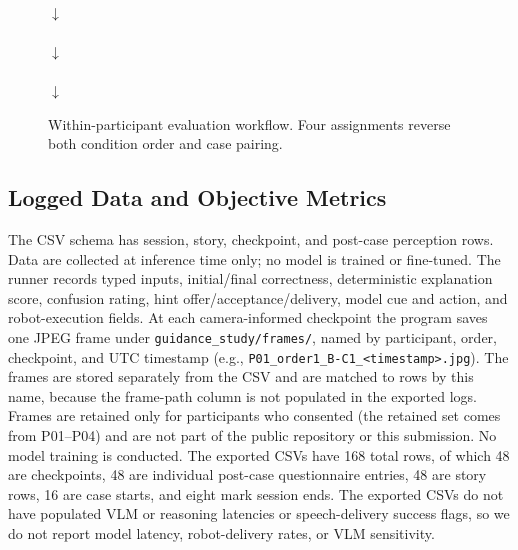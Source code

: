 \documentclass[conference]{IEEEtran}
\begin{document}
\begin{figure}[t]
\centering\footnotesize
{}\\[3pt]$\downarrow$\\[1pt]
\\[3pt]$\downarrow$\\[1pt]
\\[3pt]$\downarrow$\\[1pt]
\caption{Within-participant evaluation workflow. Four assignments reverse both condition order and case pairing.}
\label{fig:workflow}
\end{figure}

\subsection{Logged Data and Objective Metrics}
The CSV schema has session, story, checkpoint, and post-case perception rows. Data are collected at inference time only; no model is trained or fine-tuned. The runner records typed inputs, initial/final correctness, deterministic explanation score, confusion rating, hint offer/acceptance/delivery, model cue and action, and robot-execution fields. At each camera-informed checkpoint the program saves one JPEG frame under \texttt{guidance\_study/frames/}, named by participant, order, checkpoint, and UTC timestamp (e.g., \texttt{P01\_order1\_B-C1\_<timestamp>.jpg}). The frames are stored separately from the CSV and are matched to rows by this name, because the frame-path column is not populated in the exported logs. Frames are retained only for participants who consented (the retained set comes from P01--P04) and are not part of the public repository or this submission. No model training is conducted. The exported CSVs have 168 total rows, of which 48 are checkpoints, 48 are individual post-case questionnaire entries, 48 are story rows, 16 are case starts, and eight mark session ends. The exported CSVs do not have populated VLM or reasoning latencies or speech-delivery success flags, so we do not report model latency, robot-delivery rates, or VLM sensitivity.
\end{document}
